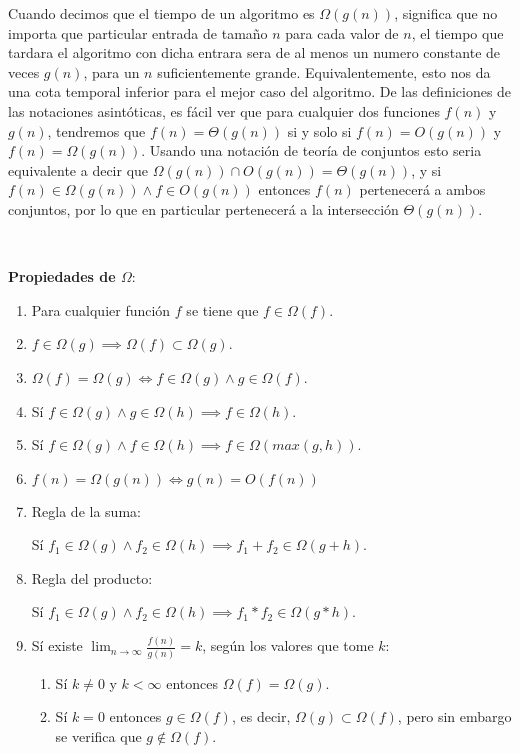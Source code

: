 Cuando decimos que el tiempo de un algoritmo es $\Omega(g(n))$, significa que no importa que particular entrada de tama\~no $n$ para cada valor de $n$, el tiempo que tardara el algoritmo con dicha entrara sera de al menos un numero constante de veces $g(n)$, para un $n$ suficientemente grande. Equivalentemente, esto nos da una cota temporal inferior para el mejor caso del algoritmo. De las definiciones de las notaciones asint\'oticas, es f\'acil ver que para cualquier dos funciones $f(n)$ y $g(n)$, tendremos que $f(n) = \Theta(g(n))$ si y solo si $f(n) = O(g(n))$ y $f(n) = \Omega(g(n))$. Usando una notaci\'on de teor\'ia de conjuntos esto seria equivalente a decir que $\Omega(g(n)) \cap O(g(n)) = \Theta(g(n))$, y si $f(n) \in \Omega(g(n)) \land f \in O(g(n))$ entonces $f(n)$ pertenecer\'a a ambos conjuntos, por lo que en particular pertenecer\'a a la intersecci\'on $\Theta(g(n))$.

~

\textbf{Propiedades de $\Omega$}:
\begin{enumerate}
 \item Para cualquier funci\'on $f$ se tiene que $f \in \Omega(f)$.
 \item $f \in \Omega(g) \implies \Omega(f) \subset \Omega(g)$.
 \item $\Omega(f) = \Omega(g) \iff f \in \Omega(g) \land g \in \Omega(f)$.
 \item S\'i $f \in \Omega(g) \land g \in \Omega(h) \implies f \in \Omega(h)$.
 \item S\'i $f \in \Omega(g) \land f \in \Omega(h) \implies f \in \Omega(max(g,h))$.
 \item $f(n) = \Omega(g(n)) \iff g(n) = O(f(n))$
 \item Regla de la suma:

	S\'i $f_1 \in \Omega(g) \land f_2 \in \Omega(h) \implies f_1 + f_2 \in \Omega(g+h)$.
 \item Regla del producto:

	S\'i $f_1 \in \Omega(g) \land f_2 \in \Omega(h) \implies f_1 * f_2 \in \Omega(g*h)$.
 \item S\'i existe $\lim_{n \to \infty} \frac{f(n)}{g(n)} = k$, seg\'un los valores que tome $k$:
	\begin{enumerate}
	  \item S\'i $k \neq 0$ y $k < \infty$ entonces $\Omega(f) = \Omega(g)$.
	  \item S\'i $k = 0$ entonces $g \in \Omega(f)$, es decir, $\Omega(g) \subset \Omega(f)$, pero sin embargo se verifica que $g \notin \Omega(f)$.
	\end{enumerate}
\end{enumerate}
